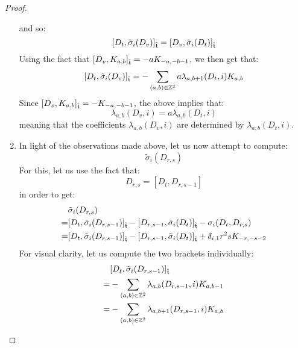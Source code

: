 \begin{proof}
\begin{enumerate}
                    and so:
                        $$[D_t, \tilde{\sigma}_i(D_v)]_{\hat{\mathfrak{t}}} = [D_v, \tilde{\sigma}_i(D_t)]_{\hat{\mathfrak{t}}}$$
                    Using the fact that $[D_v, K_{a, b}]_{\hat{\mathfrak{t}}} = -a K_{-a, -b - 1}$, we then get that:
                        $$[D_t, \tilde{\sigma}_i(D_v)]_{\hat{\mathfrak{t}}} = -\sum_{(a, b) \in \mathbb{Z}^2} a \lambda_{a, b + 1}(D_t, i) K_{a, b}$$
                    Since $[D_v, K_{a, b}]_{\hat{\mathfrak{t}}} = -K_{-a, -b - 1}$, the above implies that:
                        $$\lambda_{a, b}(D_v, i) = a\lambda_{a, b}(D_t, i)$$
                    meaning that the coefficients $\lambda_{a, b}(D_v, i)$ are determined by $\lambda_{a, b}(D_t, i)$. 
                    \item In light of the observations made above, let us now attempt to compute:
                        $$\tilde{\sigma}_i(D_{r, s})$$
                    For this, let us use the fact that:
                        $$D_{r, s} = [D_t, D_{r, s - 1}]$$
                    in order to get:
                        $$
                            \begin{aligned}
                                & \tilde{\sigma}_i(D_{r, s})
                                \\
                                = & [D_t, \tilde{\sigma}_i(D_{r, s - 1})]_{\hat{\mathfrak{t}}} - [D_{r, s - 1}, \tilde{\sigma}_i(D_t)]_{\hat{\mathfrak{t}}} - \sigma_i(D_t, D_{r, s})
                                \\
                                = & [D_t, \tilde{\sigma}_i(D_{r, s - 1})]_{\hat{\mathfrak{t}}} - [D_{r, s - 1}, \tilde{\sigma}_i(D_t)]_{\hat{\mathfrak{t}}} + \delta_{i, 1} r^2 s K_{-r, -s - 2}
                            \end{aligned}
                        $$
                    For visual clarity, let us compute the two brackets individually:
                        $$
                            \begin{aligned}
                                & [D_t, \tilde{\sigma}_i(D_{r, s - 1})]_{\hat{\mathfrak{t}}}
                                \\
                                = & -\sum_{(a, b) \in \mathbb{Z}^2} \lambda_{a, b}(D_{r, s - 1}, i) K_{a, b - 1}
                                \\
                                = & -\sum_{(a, b) \in \mathbb{Z}^2} \lambda_{a, b + 1}(D_{r, s - 1}, i) K_{a, b}
                            \end{aligned}
                        $$

\end{enumerate}
\end{proof}
